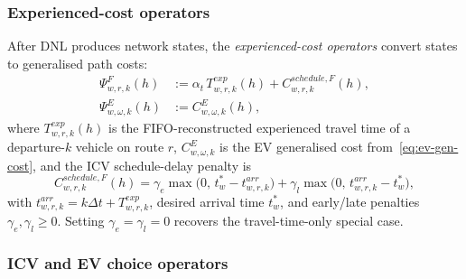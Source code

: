 \subsubsection{Experienced-cost operators}
\label{sec:traffic-psi}

After DNL produces network states, the \emph{experienced-cost operators}
convert states to generalised path costs:
\begin{align}
  \Psi^F_{w,r,k}(h) &:=
    \alpha_t\,T^{exp}_{w,r,k}(h) + C^{schedule,F}_{w,r,k}(h),
    \label{eq:psi-icv} \\
  \Psi^E_{w,\omega,k}(h) &:=
    C^E_{w,\omega,k}(h),
    \label{eq:psi-ev}
\end{align}
where $T^{exp}_{w,r,k}(h)$ is the FIFO-reconstructed experienced travel
time of a departure-$k$ vehicle on route $r$,
$C^E_{w,\omega,k}$ is the EV generalised cost from~\eqref{eq:ev-gen-cost},
and the ICV schedule-delay penalty is
\begin{equation}
  C^{schedule,F}_{w,r,k}(h)
  = \gamma_e \max\!\bigl(0,\, t^*_w - t^{arr}_{w,r,k}\bigr)
  + \gamma_l \max\!\bigl(0,\, t^{arr}_{w,r,k} - t^*_w\bigr),
  \label{eq:icv-schedule-delay}
\end{equation}
with $t^{arr}_{w,r,k} = k\Delta t + T^{exp}_{w,r,k}$, desired arrival
time $t^*_w$, and early/late penalties $\gamma_e, \gamma_l \ge 0$.
Setting $\gamma_e = \gamma_l = 0$ recovers the travel-time-only special
case.

\subsubsection{ICV and EV choice operators}

